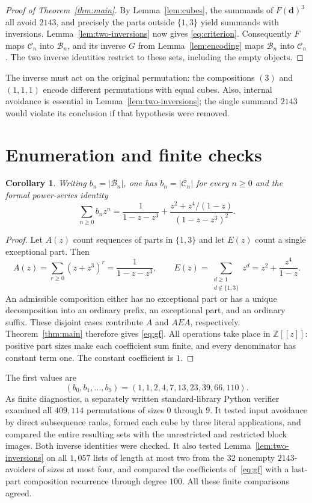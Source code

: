 \documentclass[11pt]{article}
\newtheorem{corollary}[theorem]{Corollary}
\newcommand{\C}{\mathcal C}
\newcommand{\B}{\mathcal B}
\begin{document}
\begin{proof}[Proof of Theorem~\ref{thm:main}]
By Lemma~\ref{lem:cubes}, the summands of $F(\mathbf d)^3$ all avoid
$2143$, and precisely the parts outside $\{1,3\}$ yield summands
with inversions. Lemma~\ref{lem:two-inversions} now gives
\eqref{eq:criterion}. Consequently $F$ maps $\C_n$ into $\B_n$,
and its inverse $G$ from Lemma~\ref{lem:encoding} maps $\B_n$ into
$\C_n$. The two inverse identities restrict to these sets, including
the empty objects.
\end{proof}

The inverse must act on the original permutation: the compositions
$(3)$ and $(1,1,1)$ encode different permutations with equal cubes.
Also, internal avoidance is essential in Lemma~\ref{lem:two-inversions};
the single summand $2143$ would violate its conclusion if that hypothesis
were removed.

\section{Enumeration and finite checks}

\begin{corollary}\label{cor:gf}
Writing $b_n=|\B_n|$, one has $b_n=|\C_n|$ for every $n\geq0$ and
the formal power-series identity
\begin{equation}\label{eq:gf}
\sum_{n\geq0}b_nz^n
=\frac{1}{1-z-z^3}
 +\frac{z^2+z^4/(1-z)}{(1-z-z^3)^2}.
\end{equation}
\end{corollary}

\begin{proof}
Let $A(z)$ count sequences of parts in $\{1,3\}$ and let $E(z)$
count a single exceptional part. Then
\[
A(z)=\sum_{r\geq0}(z+z^3)^r=\frac{1}{1-z-z^3},\qquad
E(z)=\sum_{\substack{d\geq1\\d\notin\{1,3\}}}z^d
    =z^2+\frac{z^4}{1-z}.
\]
An admissible composition either has no exceptional part or has a
unique decomposition into an ordinary prefix, an exceptional part,
and an ordinary suffix. These disjoint cases contribute $A$ and
$AEA$, respectively. Theorem~\ref{thm:main} therefore gives
\eqref{eq:gf}. All operations take place in $\mathbb Z[[z]]$:
positive part sizes make each coefficient sum finite, and every
denominator has constant term one. The constant coefficient is $1$.
\end{proof}

The first values are
\[
(b_0,b_1,\ldots,b_9)=(1,1,2,4,7,13,23,39,66,110).
\]
As finite diagnostics, a separately written standard-library Python
verifier examined all $409{,}114$ permutations of sizes $0$ through $9$.
It tested input avoidance by direct subsequence ranks, formed each cube
by three literal applications, and compared the entire resulting sets
with the unrestricted and restricted block images. Both inverse
identities were checked. It also tested Lemma~\ref{lem:two-inversions}
on all $1{,}057$ lists of length at most two from the $32$ nonempty
$2143$-avoiders of sizes at most four, and compared the coefficients
of~\eqref{eq:gf} with a last-part composition recurrence through
degree $100$. All these finite comparisons agreed.
\end{document}
